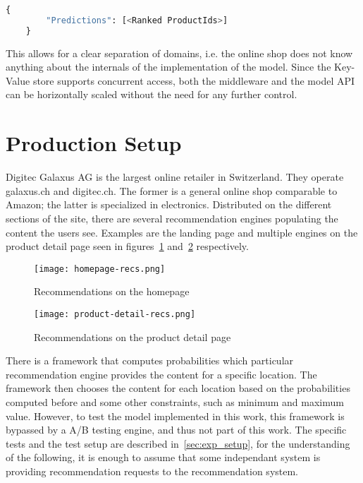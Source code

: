 \begin{minipage}{\linewidth}
    \begin{lstlisting}[language=Python,frame=single,caption=Middleware API Output,label=code:api_output]
    {
        "Predictions": [<Ranked ProductIds>]
    }
    \end{lstlisting}
\end{minipage}
This allows for a clear separation of domains, i.e. the online shop does not know anything about the internals of the implementation of the model.
Since the Key-Value store supports concurrent access, both the middleware and the model API can be horizontally scaled without the need for any further control.
\section{Production Setup}
Digitec Galaxus AG is the largest online retailer in Switzerland.
They operate galaxus.ch and digitec.ch. 
The former is a general online shop comparable to Amazon; the latter is specialized in electronics.
Distributed on the different sections of the site, there are several recommendation engines populating the content the users see.
Examples are the landing page and multiple engines on the product detail page seen in figures~\ref{fig:homepage_recs} and~\ref{fig:product_detail_recs} respectively.
\begin{figure}[t]
	\centering
	\captionsetup{width=0.8\textwidth}
    \texttt{[image: homepage-recs.png]}
    \caption{Recommendations on the homepage}
    \label{fig:homepage_recs}
\end{figure}
\begin{figure}[t]
	\centering
	\captionsetup{width=0.8\textwidth}
    \texttt{[image: product-detail-recs.png]}
    \caption{Recommendations on the product detail page}
    \label{fig:product_detail_recs}
\end{figure}
There is a framework that computes probabilities which particular recommendation engine provides the content for a specific location.
The framework then chooses the content for each location based on the probabilities computed before and some other constraints, such as minimum and maximum value.
However, to test the model implemented in this work, this framework is bypassed by a A/B testing engine, and thus not part of this work.
The specific tests and the test setup are described in~\ref{sec:exp_setup}, for the understanding of the following, it is enough to assume that some independant system is providing recommendation requests to the recommendation system.
